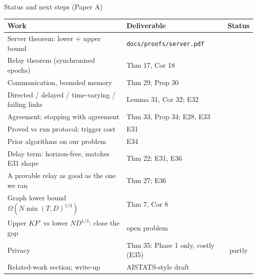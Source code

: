 \documentclass[11pt]{beamer}
\newcommand{\yes}{\textcolor{green!45!black}{\ding{51}}}
\newcommand{\todo}{\textcolor{orange!85!black}{\ding{109}}}
\begin{document}
\begin{frame}{Status and next steps (Paper A)}
\tiny
\renewcommand{\arraystretch}{0.95}
\begin{tabular}{>{\raggedright\arraybackslash}p{5.3cm}>{\raggedright\arraybackslash}p{4.1cm}c}
\toprule
\textbf{Work} & \textbf{Deliverable} & \textbf{Status}\\
\midrule
Server theorem: lower + upper bound & \texttt{docs/proofs/server.pdf} & \yes\\
Relay theorem (synchronised epochs) & Thm 17, Cor 18 & \yes\\
Communication, bounded memory & Thm 29, Prop 30 & \yes\\
Directed / delayed / time-varying / failing links & Lemma 31, Cor 32; E32 & \yes\\
Agreement; stopping with agreement & Thm 33, Prop 34; E28, E33 & \yes\\
Proved vs run protocol; trigger cost & E31 & \yes\\
Prior algorithms on our problem & E34 & \yes\\
\midrule
Delay term: horizon-free, matches E31 shape & Thm 22; E31, E36 & \yes\\
A provable relay as good as the one we ran & Thm 27; E36 & \yes\\
Graph lower bound $\Omega(N\min(T,D)^{1/3})$ & Thm 7, Cor 8 & \yes\\
Upper $KF'$ vs lower $ND^{1/3}$: close the gap & open problem & \todo\\
Privacy & Thm 35: Phase 1 only, costly (E35) & \textcolor{orange!85!black}{partly}\\
\midrule

Related-work section; write-up & AISTATS-style draft & \todo\\
\bottomrule
\end{tabular}
\vspace{0.1em}
\begin{center}
\end{center}
\end{frame}
\end{document}
